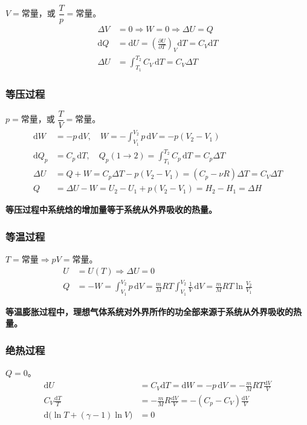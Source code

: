 \documentclass[UTF8]{ctexart}
\theoremstyle{definition}
\begin{document}
$V = \text{常量}$，或 $\dfrac{T}{p} = \text{常量}$。
\begin{align}
\Delta V &= 0 \Rightarrow W = 0 \Rightarrow \Delta U = Q \\
\mathrm{d}Q &= \mathrm{d}U = \left(\frac{\partial U}{\partial T}\right)_V\mathrm{d}T = C_V\mathrm{d}T \\
\Delta U &= \int_{T_1}^{T_2} C_V\,\mathrm{d}T = C_V\Delta T
\end{align}

\subsubsection*{等压过程}

$p = \text{常量}$，或 $\dfrac{T}{V} = \text{常量}$。
\begin{align}
\mathrm{d}W &= -p\,\mathrm{d}V,\quad W = -\int_{V_1}^{V_2}p\,\mathrm{d}V = -p(V_2-V_1) \\
\mathrm{d}Q_p &= C_p\,\mathrm{d}T,\quad Q_p(1\to 2) = \int_{T_1}^{T_2}C_p\,\mathrm{d}T = C_p\Delta T \\
\Delta U &= Q+W = C_p\Delta T - p(V_2-V_1) = (C_p-\nu R)\Delta T = C_V\Delta T \\
Q &= \Delta U - W = U_2-U_1+p(V_2-V_1) = H_2-H_1 = \Delta H
\end{align}

\textbf{等压过程中系统焓的增加量等于系统从外界吸收的热量。}

\subsubsection*{等温过程}

$T = \text{常量} \Rightarrow pV = \text{常量}$。
\begin{align}
U &= U(T) \Rightarrow \Delta U = 0 \\
Q &= -W = \int_{V_1}^{V_2}p\,\mathrm{d}V = \frac{m}{M}RT\int_{V_1}^{V_2}\frac{1}{V}\,\mathrm{d}V = \frac{m}{M}RT\ln\frac{V_2}{V_1}
\end{align}

\textbf{等温膨胀过程中，理想气体系统对外界所作的功全部来源于系统从外界吸收的热量。}

\subsubsection*{绝热过程}

$Q=0$。
\begin{align}
\mathrm{d}U &= C_V\mathrm{d}T = \mathrm{d}W = -p\,\mathrm{d}V = -\frac{m}{M}RT\frac{\mathrm{d}V}{V} \\
C_V\frac{\mathrm{d}T}{T} &= -\frac{m}{M}R\frac{\mathrm{d}V}{V} = -(C_p-C_V)\frac{\mathrm{d}V}{V} \\
\mathrm{d}\bigl(\ln T + (\gamma-1)\ln V\bigr) &= 0
\end{align}
\end{document}

